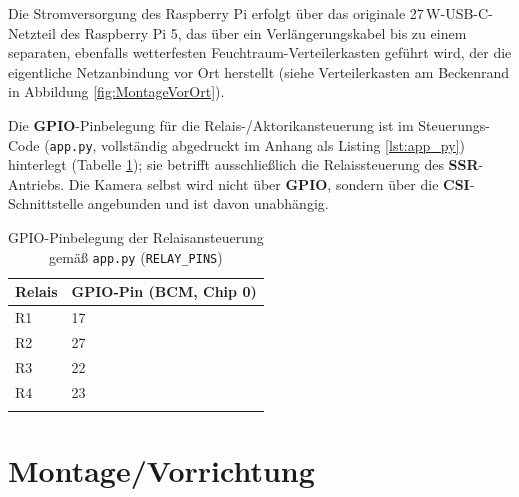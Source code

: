 Die Stromversorgung des Raspberry Pi erfolgt über das originale 27\,W-USB-C-Netzteil des Raspberry Pi 5, das über ein Verlängerungskabel bis zu einem separaten, ebenfalls wetterfesten Feuchtraum-Verteilerkasten geführt wird, der die eigentliche Netzanbindung vor Ort herstellt (siehe Verteilerkasten am Beckenrand in Abbildung \ref{fig:MontageVorOrt}).

Die \textbf{GPIO}-Pinbelegung für die Relais-/Aktorikansteuerung ist im Steuerungs-Code (\texttt{app.py}, vollständig abgedruckt im Anhang als Listing \ref{lst:app_py}) hinterlegt (Tabelle \ref{tab:GPIOBelegung}); sie betrifft ausschließlich die Relaissteuerung des \textbf{SSR}-Antriebs. Die Kamera selbst wird nicht über \textbf{GPIO}, sondern über die \textbf{CSI}-Schnittstelle angebunden und ist davon unabhängig.

\begin{table}[h]
    \centering
    \begin{tabular}{ll}
        \hline
        Relais & GPIO-Pin (BCM, Chip 0) \\
        \hline
        R1 & 17 \\
        R2 & 27 \\
        R3 & 22 \\
        R4 & 23 \\
        \hline
        \\
    \end{tabular}
    \caption{GPIO-Pinbelegung der Relaisansteuerung gemäß \texttt{app.py} (\texttt{RELAY\_PINS})}
    \label{tab:GPIOBelegung}
\end{table}

\section{Montage/Vorrichtung}

